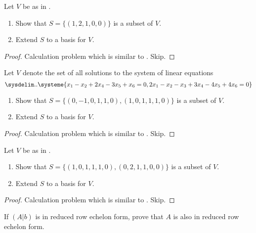 \begin{exercise} \label{exercise 3.4.11}
Let \(V\) be as in .
\begin{enumerate}
\item Show that \(S = \{ (1 , 2, 1, 0, 0) \}\) is a \LID{} subset of \(V\).
\item Extend \(S\) to a basis for \(V\).
\end{enumerate}
\end{exercise}

\begin{proof}
Calculation problem which is similar to . Skip.
\end{proof}

\begin{exercise} \label{exercise 3.4.12}
Let \(V\) denote the set of all solutions to the system of linear equations
\[
    \sysdelim..\systeme{
        x_1 - x_2 + 2x_4 - 3x_5 + x_6 = 0,
        2x_1 - x_2 - x_3 + 3x_4 - 4x_5 + 4x_6 = 0
    }
\]
\begin{enumerate}
\item Show that \(S = \{ (0,-1,0,1,1,0), (1,0,1,1,1,0) \}\) is a \LID{} subset of \(V\).
\item Extend \(S\) to a basis for \(V\).
\end{enumerate}
\end{exercise}

\begin{proof}
Calculation problem which is similar to . Skip.
\end{proof}

\begin{exercise} \label{exercise 3.4.13}
Let \(V\) be as in .
\begin{enumerate}
\item Show that \(S = \{ (1,0,1,1,1,0), (0,2,1,1,0,0) \}\) is a \LID{} subset of \(V\).
\item Extend \(S\) to a basis for \(V\).
\end{enumerate}
\end{exercise}

\begin{proof}
Calculation problem which is similar to . Skip.
\end{proof}

\begin{exercise} \label{exercise 3.4.14}
If \((A|b)\) is in reduced row echelon form, prove that \(A\) is also in reduced row echelon form.
\end{exercise}

